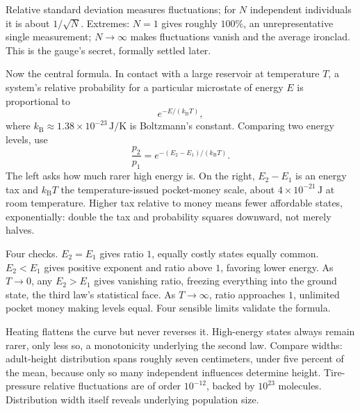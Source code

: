 Relative standard deviation measures fluctuations; for \(N\) independent individuals it is about \(1/\sqrt{N}\). Extremes: \(N=1\) gives roughly \(100\%\), an unrepresentative single measurement; \(N\to\infty\) makes fluctuations vanish and the average ironclad. This is the gauge's secret, formally settled later.

Now the central formula. In contact with a large reservoir at temperature \(T\), a system's relative probability for a particular microstate of energy \(E\) is proportional to
\[
e^{-E/(k_{\mathrm B} T)},
\]
where \(k_{\mathrm B}\approx 1.38\times10^{-23}\,\mathrm{J/K}\) is Boltzmann's constant. Comparing two energy levels, use
\[
\frac{p_2}{p_1} = e^{-(E_2-E_1)/(k_{\mathrm B} T)} .
\]
The left asks how much rarer high energy is. On the right, \(E_2-E_1\) is an energy tax and \(k_{\mathrm B}T\) the temperature-issued pocket-money scale, about \(4\times10^{-21}\,\mathrm{J}\) at room temperature. Higher tax relative to money means fewer affordable states, exponentially: double the tax and probability squares downward, not merely halves.

Four checks. \(E_2=E_1\) gives ratio \(1\), equally costly states equally common. \(E_2<E_1\) gives positive exponent and ratio above \(1\), favoring lower energy. As \(T\to 0\), any \(E_2>E_1\) gives vanishing ratio, freezing everything into the ground state, the third law's statistical face. As \(T\to\infty\), ratio approaches \(1\), unlimited pocket money making levels equal. Four sensible limits validate the formula.

\begin{center}
\end{center}

Heating flattens the curve but never reverses it. High-energy states always remain rarer, only less so, a monotonicity underlying the second law. Compare widths: adult-height distribution spans roughly seven centimeters, under five percent of the mean, because only so many independent influences determine height. Tire-pressure relative fluctuations are of order \(10^{-12}\), backed by \(10^{23}\) molecules. Distribution width itself reveals underlying population size.


